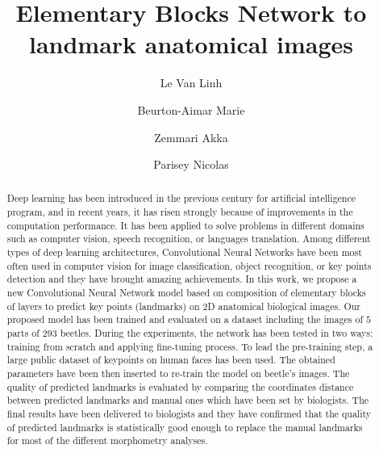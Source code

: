 \documentclass[review]{elsarticle}
\begin{document}
\begin{frontmatter}

\title{Elementary Blocks Network to landmark anatomical images}


\author[labri,itdlu]{Le Van Linh}
\author[labri]{Beurton-Aimar Marie}
\author[labri]{Zemmari Akka}
\author[igepp]{Parisey Nicolas}


\address[labri]{University of Bordeaux, 351, cours de la Libération, 33405 Talence, France}

\address[igepp]{UMR 1349 IGEPP, BP 35327, 35653 Le Rheu, France}
\address[itdlu]{Dalat University, Dalat, Lamdong, Vietnam}

\begin{abstract}
Deep learning has been introduced in the previous century for
artificial intelligence program, and in recent years, it has risen
strongly because of improvements in the computation performance. It
has been applied to solve problems in different domains such as
computer vision, speech recognition, or languages translation. Among
different types of deep learning architectures, Convolutional Neural
Networks have been most often used in computer vision for image
classification, object recognition, or key points detection and they
have brought amazing achievements. In this work, we propose a new
Convolutional Neural Network model based on composition of elementary
blocks of layers to predict key points (landmarks) on 2D anatomical
biological images. Our proposed model has been trained and evaluated
on a dataset including the images of $5$ parts of $293$
beetles. During the experiments, the network has been tested in two
ways: training from scratch and applying fine-tuning process. To lead
the pre-training step, a large public dataset of keypoints on human
faces has been used. The obtained parameters have been then inserted
to re-train the model on beetle's images. The quality of predicted
landmarks is evaluated by comparing the coordinates distance between
predicted landmarks and manual ones which have been set by
biologists. The final results have been delivered to biologists and
they have confirmed that the quality of predicted landmarks is
statistically good enough to replace the manual landmarks for most of
the different morphometry analyses.


\end{abstract}
\end{frontmatter}
\end{document}
